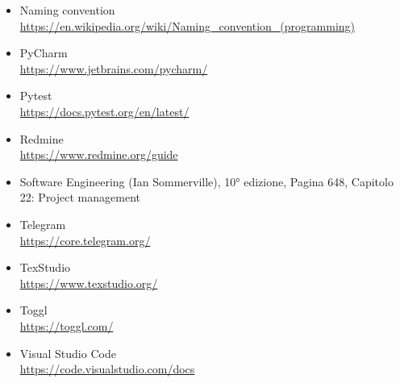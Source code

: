 \begin{itemize}
        \item Naming convention \\\url{https://en.wikipedia.org/wiki/Naming_convention_(programming)}
        \item PyCharm \\\url{https://www.jetbrains.com/pycharm/}
		\item Pytest \\\url{https://docs.pytest.org/en/latest/}
		\item Redmine \\\url{https://www.redmine.org/guide}
        \item Software Engineering (Ian Sommerville), 10° edizione,
        Pagina 648, Capitolo 22: Project management
		\item Telegram \\\url{https://core.telegram.org/}
        \item TexStudio \\\url{https://www.texstudio.org/}
        \item Toggl \\\url{https://toggl.com/}
        \item Visual Studio Code \\\url{https://code.visualstudio.com/docs}
	\end{itemize}
